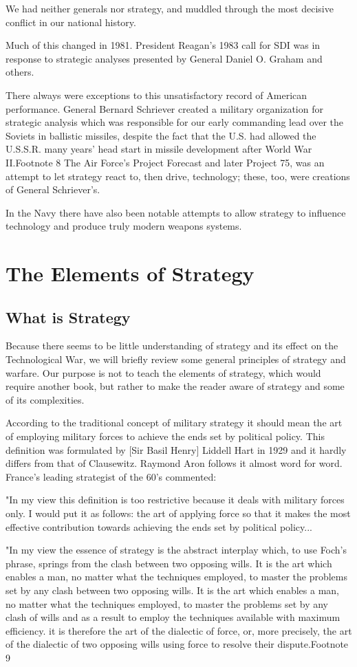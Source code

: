 \documentclass[a4paper,12pt]{book}
\begin{document}
We had neither generals nor strategy, and muddled through the most decisive conflict in our national history.

Much of this changed in 1981. President Reagan's 1983 call for SDI was in response to strategic analyses presented by General Daniel O. Graham and others.

There always were exceptions to this unsatisfactory record of American performance. General Bernard Schriever created a military organization for strategic analysis which was responsible for our early commanding lead over the Soviets in ballistic missiles, despite the fact that the U.S. had allowed the U.S.S.R. many years' head start in missile development after World War II.Footnote 8 The Air Force's Project Forecast and later Project 75, was an attempt to let strategy react to, then drive, technology; these, too, were creations of General Schriever's.

In the Navy there have also been notable attempts to allow strategy to influence technology and produce truly modern weapons systems.

\section{The Elements of Strategy}
\subsection{What is Strategy}
Because there seems to be little understanding of strategy and its effect on the Technological War, we will briefly review some general principles of strategy and warfare. Our purpose is not to teach the elements of strategy, which would require another book, but rather to make the reader aware of strategy and some of its complexities.

According to the traditional concept of military strategy it should mean the art of employing military forces to achieve the ends set by political policy. This definition was formulated by [Sir Basil Henry] Liddell Hart in 1929 and it hardly differs from that of Clausewitz. Raymond Aron follows it almost word for word. France's leading strategist of the 60's commented:

"In my view this definition is too restrictive because it deals with military forces only. I would put it as follows: the art of applying force so that it makes the most effective contribution towards achieving the ends set by political policy...

"In my view the essence of strategy is the abstract interplay which, to use Foch's phrase, springs from the clash between two opposing wills. It is the art which enables a man, no matter what the techniques employed, to master the problems set by any clash between two opposing wills. It is the art which enables a man, no matter what the techniques employed, to master the problems set by any clash of wills and as a result to employ the techniques available with maximum efficiency. it is therefore the art of the dialectic of force, or, more precisely, the art of the dialectic of two opposing wills using force to resolve their dispute.Footnote 9
\end{document}
